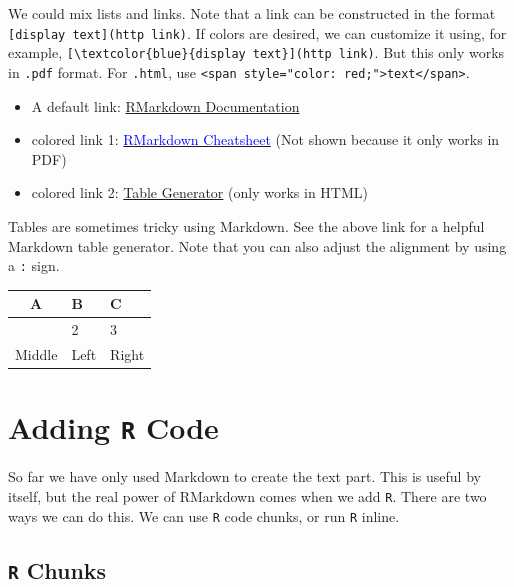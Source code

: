 \documentclass[
]{book}
\providecommand{\tightlist}{%
  \setlength{\itemsep}{0pt}\setlength{\parskip}{0pt}}
\theoremstyle{definition}
\theoremstyle{definition}
\theoremstyle{definition}
\theoremstyle{definition}
\theoremstyle{remark}
\begin{document}
We could mix lists and links. Note that a link can be constructed in the format \texttt{{[}display\ text{]}(http\ link)}. If colors are desired, we can customize it using, for example, \texttt{{[}\textbackslash{}textcolor\{blue\}\{display\ text\}{]}(http\ link)}. But this only works in \texttt{.pdf} format. For \texttt{.html}, use \texttt{\textless{}span\ style="color:\ red;"\textgreater{}text\textless{}/span\textgreater{}}.

\begin{itemize}
\tightlist
\item
  A default link: \href{http://rmarkdown.rstudio.com/}{RMarkdown Documentation}
\item
  colored link 1: \href{https://www.rstudio.com/wp-content/uploads/2015/02/rmarkdown-cheatsheet.pdf}{\textcolor{blue}{RMarkdown Cheatsheet}} (Not shown because it only works in PDF)
\item
  colored link 2: \href{http://www.tablesgenerator.com/markdown_tables}{{Table Generator}} (only works in HTML)
\end{itemize}

Tables are sometimes tricky using Markdown. See the above link for a helpful Markdown table generator. Note that you can also adjust the alignment by using a \texttt{:} sign.

\begin{longtable}[]{@{}cll@{}}
\toprule\noalign{}
A & B & C \\
\midrule\noalign{}
\endhead
\bottomrule\noalign{}
\endlastfoot
1 & 2 & 3 \\
Middle & Left & Right \\
\end{longtable}

\hypertarget{adding-r-code}{%
\section{\texorpdfstring{Adding \texttt{R} Code}{Adding R Code}}\label{adding-r-code}}

So far we have only used Markdown to create the text part. This is useful by itself, but the real power of RMarkdown comes when we add \texttt{R}. There are two ways we can do this. We can use \texttt{R} code chunks, or run \texttt{R} inline.

\hypertarget{r-chunks}{%
\subsection{\texorpdfstring{\texttt{R} Chunks}{R Chunks}}\label{r-chunks}}
\end{document}
